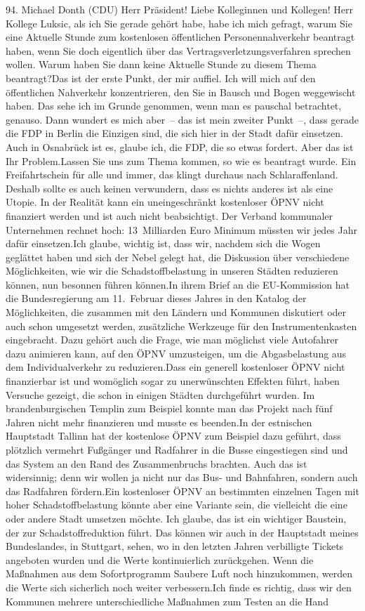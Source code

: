 \documentclass{article}
\begin{document}
	94. Michael Donth (CDU) Herr Präsident! Liebe Kolleginnen und Kollegen! Herr Kollege Luksic, als ich Sie gerade gehört habe, habe ich mich gefragt, warum Sie eine Aktuelle Stunde zum kostenlosen öffentlichen Personennahverkehr beantragt haben, wenn Sie doch eigentlich über das Vertragsverletzungsverfahren sprechen wollen. Warum haben Sie dann keine Aktuelle Stunde zu diesem Thema beantragt?Das ist der erste Punkt, der mir auffiel. Ich will mich auf den öffentlichen Nahverkehr konzentrieren, den Sie in Bausch und Bogen weggewischt haben. Das sehe ich im Grunde genommen, wenn man es pauschal betrachtet, genauso. Dann wundert es mich aber – das ist mein zweiter Punkt –, dass gerade die FDP in Berlin die Einzigen sind, die sich hier in der Stadt dafür einsetzen. Auch in Osnabrück ist es, glaube ich, die FDP, die so etwas fordert. Aber das ist Ihr Problem.Lassen Sie uns zum Thema kommen, so wie es beantragt wurde. Ein Freifahrtschein für alle und immer, das klingt durchaus nach Schlaraffenland. Deshalb sollte es auch keinen verwundern, dass es nichts anderes ist als eine Utopie. In der Realität kann ein uneingeschränkt kostenloser ÖPNV nicht finanziert werden und ist auch nicht beabsichtigt. Der Verband kommunaler Unternehmen rechnet hoch: 13 Milliarden Euro Minimum müssten wir jedes Jahr dafür einsetzen.Ich glaube, wichtig ist, dass wir, nachdem sich die Wogen geglättet haben und sich der Nebel gelegt hat, die Diskussion über verschiedene Möglichkeiten, wie wir die Schadstoffbelastung in unseren Städten reduzieren können, nun besonnen führen können.In ihrem Brief an die EU-Kommission hat die Bundesregierung am 11. Februar dieses Jahres in den Katalog der Möglichkeiten, die zusammen mit den Ländern und Kommunen diskutiert oder auch schon umgesetzt werden, zusätzliche Werkzeuge für den Instrumentenkasten eingebracht. Dazu gehört auch die Frage, wie man möglichst viele Autofahrer dazu animieren kann, auf den ÖPNV umzusteigen, um die Abgasbelastung aus dem Individualverkehr zu reduzieren.Dass ein generell kostenloser ÖPNV nicht finanzierbar ist und womöglich sogar zu unerwünschten Effekten führt, haben Versuche gezeigt, die schon in einigen Städten durchgeführt wurden. Im brandenburgischen Templin zum Beispiel konnte man das Projekt nach fünf Jahren nicht mehr finanzieren und musste es beenden.In der estnischen Hauptstadt Tallinn hat der kostenlose ÖPNV zum Beispiel dazu geführt, dass plötzlich vermehrt Fußgänger und Radfahrer in die Busse eingestiegen sind und das System an den Rand des Zusammenbruchs brachten. Auch das ist widersinnig; denn wir wollen ja nicht nur das Bus- und Bahnfahren, sondern auch das Radfahren fördern.Ein kostenloser ÖPNV an bestimmten einzelnen Tagen mit hoher Schadstoffbelastung könnte aber eine Variante sein, die vielleicht die eine oder andere Stadt umsetzen möchte. Ich glaube, das ist ein wichtiger Baustein, der zur Schadstoffreduktion führt. Das können wir auch in der Hauptstadt meines Bundeslandes, in Stuttgart, sehen, wo in den letzten Jahren verbilligte Tickets angeboten wurden und die Werte kontinuierlich zurückgehen. Wenn die Maßnahmen aus dem Sofortprogramm Saubere Luft noch hinzukommen, werden die Werte sich sicherlich noch weiter verbessern.Ich finde es richtig, dass wir den Kommunen mehrere unterschiedliche Maßnahmen zum Testen an die Hand 
\end{document}
